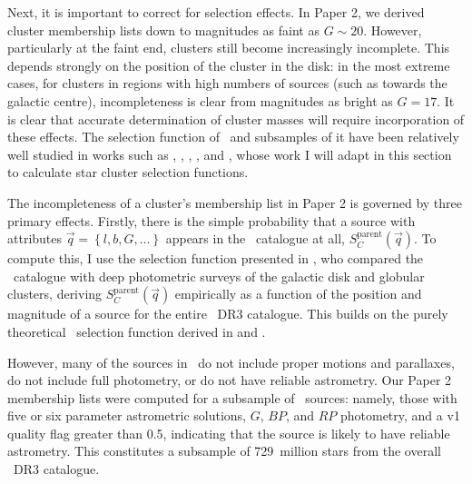 Next, it is important to correct for selection effects. In Paper 2, we derived cluster membership lists down to magnitudes as faint as $G\sim20$. However, particularly at the faint end, clusters still become increasingly incomplete. This depends strongly on the position of the cluster in the disk: in the most extreme cases, for clusters in regions with high numbers of sources (such as towards the galactic centre), incompleteness is clear from magnitudes as bright as $G=17$. It is clear that accurate determination of cluster masses will require incorporation of these effects. The selection function of \gaia\ and subsamples of it have been relatively well studied in works such as \cite{boubert_completeness_2020-1}, \cite{boubert_completeness_2020}, \cite{rix_selection_functions_2021}, \cite{cantat-gaudin_empirical_model_2023}, and \cite{castro-ginard_estimating_selection_2023}, whose work I will adapt in this section to calculate star cluster selection functions.

The incompleteness of a cluster's membership list in Paper 2 is governed by three primary effects. Firstly, there is the simple probability that a source with attributes $\vec{q}=\left\{ l,b,G,... \right\}$ appears in the \gaia\ catalogue at all, $S_C^\text{parent}(\vec{q})$. To compute this, I use the selection function presented in \cite{cantat-gaudin_empirical_model_2023}, who compared the \gaia\ catalogue with deep photometric surveys of the galactic disk and globular clusters, deriving $S_C^\text{parent}(\vec{q})$ empirically as a function of the position and magnitude of a source for the entire \gaia\ DR3 catalogue. This builds on the purely theoretical \gaia\ selection function derived in \cite{boubert_completeness_2020-1} and \cite{boubert_completeness_2020}. 

However, many of the sources in \gaia\ do not include proper motions and parallaxes, do not include full photometry, or do not have reliable astrometry. Our Paper 2 membership lists were computed for a subsample of \gaia\ sources: namely, those with five or six parameter astrometric solutions, $G$, $BP$, and $RP$ photometry, and a \cite{rybizki_classifier_2022} v1 quality flag greater than 0.5, indicating that the source is likely to have reliable astrometry. This constitutes a subsample of 729~million stars from the overall \gaia\ DR3 catalogue.

